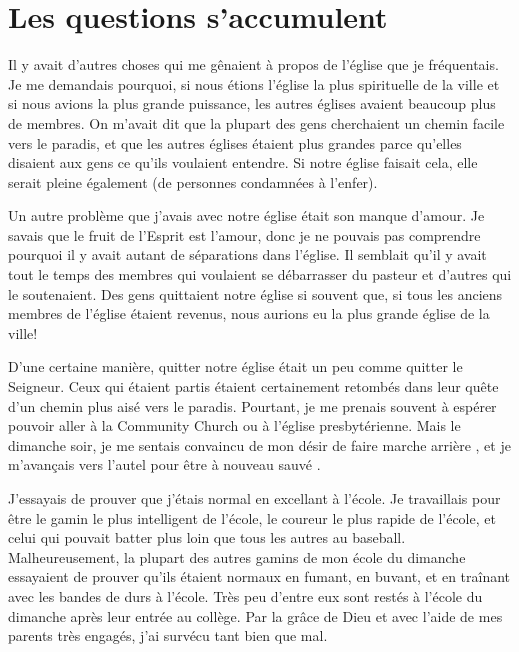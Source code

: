 \section{Les questions s'accumulent}

Il y avait d'autres choses qui me gênaient à propos de l'église que je
 fréquentais. Je me demandais pourquoi, si nous étions l'église la plus
 spirituelle de la ville et si nous avions la plus grande puissance, les autres
 églises avaient beaucoup plus de membres. On m'avait dit que la plupart des
 gens cherchaient un chemin facile vers le paradis, et que les autres églises
 étaient plus grandes parce qu'elles disaient aux gens ce qu'ils voulaient
 entendre. Si notre église faisait cela, elle serait pleine également
 (de personnes condamnées à l'enfer).

Un autre problème que j'avais avec notre église était son manque d'amour. Je
 savais que le fruit de l'Esprit est l'amour,
 donc je ne pouvais pas comprendre
 pourquoi il y avait autant de séparations dans l'église. Il semblait qu'il y
 avait tout le temps des membres qui voulaient se débarrasser du pasteur et
 d'autres qui le soutenaient. Des gens quittaient notre église si souvent que,
 si tous les anciens membres de l'église étaient revenus, nous aurions eu la
 plus grande église de la ville!

D'une certaine manière, quitter notre église était un peu comme quitter le
 Seigneur. Ceux qui étaient partis étaient certainement retombés dans leur quête
 d'un chemin plus aisé vers le paradis. Pourtant, je me prenais souvent à
 espérer pouvoir aller à la Community Church ou à l'église presbytérienne. Mais
 le dimanche soir, je me sentais convaincu de mon désir de \og faire marche
 arrière \fg{}, et je m'avançais vers l'autel pour être à nouveau
 \og sauvé \fg{}.

J'essayais de prouver que j'étais normal en excellant à l'école. Je travaillais
 pour être le gamin le plus intelligent de l'école, le coureur le plus rapide de
 l'école, et celui qui pouvait batter plus loin que tous les autres au baseball.
 Malheureusement, la plupart des autres gamins de mon école du dimanche
 essayaient de prouver qu'ils étaient normaux en fumant, en buvant, et en
 traînant avec les bandes de durs à l'école. Très peu d'entre eux sont restés à
 l'école du dimanche après leur entrée au collège. Par la grâce de Dieu et avec
 l'aide de mes parents très engagés, j'ai survécu tant bien que mal.

